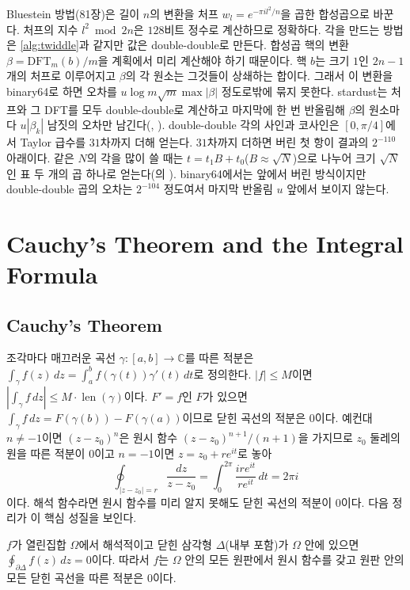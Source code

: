 Bluestein 방법(81장)은 길이 $n$의 변환을 처프 $w_l=e^{-\pi il^2/n}$을 곱한 합성곱으로 바꾼다. 처프의 지수 $l^2\bmod2n$은 $128$비트 정수로 계산하므로 정확하다. 각을 만드는 방법은 \cref{alg:twiddle}과 같지만 값은 double-double로 만든다. 합성곱 핵의 변환 $\beta=\mathrm{DFT}_m(b)/m$을 계획에서 미리 계산해야 하기 때문이다. 핵 $b$는 크기 $1$인 $2n-1$개의 처프로 이루어지고 $\beta$의 각 원소는 그것들이 상쇄하는 합이다. 그래서 이 변환을 binary64로 하면 오차를 $u\log m\sqrt m\max|\beta|$ 정도로밖에 묶지 못한다. stardust는 처프와 그 DFT를 모두 double-double로 계산하고 마지막에 한 번 반올림해 $\beta$의 원소마다 $u|\beta_k|$ 남짓의 오차만 남긴다(, ). double-double 각의 사인과 코사인은 $[0,\pi/4]$에서 Taylor 급수를 $31$차까지 더해 얻는다. $31$차까지 더하면 버린 첫 항이 결과의 $2^{-110}$ 아래이다. 같은 $N$의 각을 많이 쓸 때는 $t=t_1B+t_0$($B\approx\sqrt N$)으로 나누어 크기 $\sqrt N$인 표 두 개의 곱 하나로 얻는다(의 ). binary64에서는 앞에서 버린 방식이지만 double-double 곱의 오차는 $2^{-104}$ 정도여서 마지막 반올림 $u$ 앞에서 보이지 않는다.


\section{Cauchy's Theorem and the Integral Formula}
\label{sec:cauchy}

\subsection{Cauchy's Theorem}

조각마다 매끄러운 곡선 $\gamma:[a,b]\to\mathbb{C}$를 따른 적분은 $\int_\gamma f(z)\,dz=\int_a^bf(\gamma(t))\gamma'(t)\,dt$로 정의한다. $|f|\le M$이면 $|\int_\gamma f\,dz|\le M\cdot\operatorname{len}(\gamma)$이다. $F'=f$인 $F$가 있으면 $\int_\gamma f\,dz=F(\gamma(b))-F(\gamma(a))$이므로 닫힌 곡선의 적분은 $0$이다. 예컨대 $n\ne-1$이면 $(z-z_0)^n$은 원시 함수 $(z-z_0)^{n+1}/(n+1)$을 가지므로 $z_0$ 둘레의 원을 따른 적분이 $0$이고 $n=-1$이면 $z=z_0+re^{it}$로 놓아
\begin{equation}
\label{eq:circle-integral}
\oint_{|z-z_0|=r}\frac{dz}{z-z_0}=\int_0^{2\pi}\frac{ire^{it}}{re^{it}}\,dt=2\pi i
\end{equation}
이다. 해석 함수라면 원시 함수를 미리 알지 못해도 닫힌 곡선의 적분이 $0$이다. 다음 정리가 이 핵심 성질을 보인다.

\begin{theorem}
\label{thm:cauchy}
$f$가 열린집합 $\Omega$에서 해석적이고 닫힌 삼각형 $\Delta$(내부 포함)가 $\Omega$ 안에 있으면 $\oint_{\partial\Delta}f(z)\,dz=0$이다. 따라서 $f$는 $\Omega$ 안의 모든 원판에서 원시 함수를 갖고 원판 안의 모든 닫힌 곡선을 따른 적분은 $0$이다.
\end{theorem}

